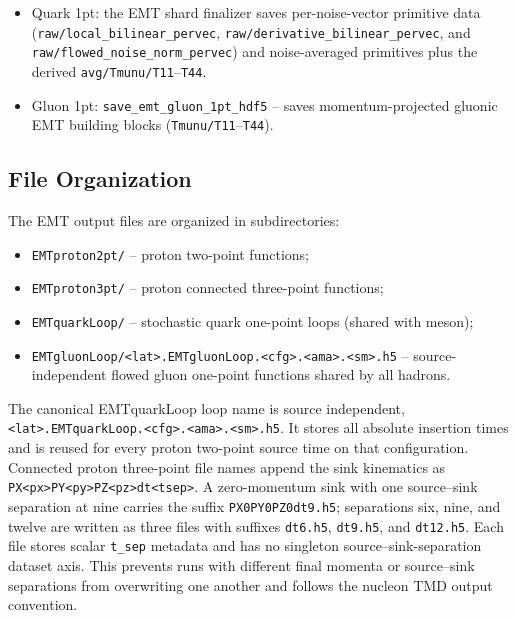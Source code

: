 \documentclass[11pt,a4paper]{article}
\begin{document}
\begin{itemize}
  \item Quark 1pt: the EMT shard finalizer saves per-noise-vector primitive data
        (\texttt{raw/local\_bilinear\_pervec},
        \texttt{raw/derivative\_bilinear\_pervec}, and
        \texttt{raw/flowed\_noise\_norm\_pervec}) and noise-averaged primitives plus the
        derived \texttt{avg/Tmunu/T11}--\texttt{T44}.

  \item Gluon 1pt: \texttt{save\_emt\_gluon\_1pt\_hdf5} --
        saves momentum-projected gluonic EMT building blocks
        (\texttt{Tmunu/T11}--\texttt{T44}).
\end{itemize}

\subsection{File Organization}

The EMT output files are organized in subdirectories:
\begin{itemize}
  \item \texttt{EMTproton2pt/} -- proton two-point functions;
  \item \texttt{EMTproton3pt/} -- proton connected three-point functions;
  \item \texttt{EMTquarkLoop/} -- stochastic quark one-point loops (shared with meson);
  \item \texttt{EMTgluonLoop/<lat>.EMTgluonLoop.<cfg>.<ama>.<sm>.h5} -- source-independent
        flowed gluon one-point functions shared by all hadrons.
\end{itemize}
The canonical EMTquarkLoop loop name is source independent,
\texttt{<lat>.EMTquarkLoop.<cfg>.<ama>.<sm>.h5}.  It stores all absolute insertion
times and is reused for every proton two-point source time on that
configuration.
Connected proton three-point file names append the sink kinematics as
\texttt{PX<px>PY<py>PZ<pz>dt<tsep>}.  A zero-momentum sink with one
source--sink separation at nine carries the suffix
\texttt{PX0PY0PZ0dt9.h5}; separations six, nine, and twelve are written as
three files with suffixes \texttt{dt6.h5}, \texttt{dt9.h5}, and
\texttt{dt12.h5}.  Each file stores scalar \texttt{t\_sep} metadata and has
no singleton source--sink-separation dataset axis.  This prevents runs with different
final momenta or source--sink separations from overwriting one another and
follows the nucleon TMD output convention.

\end{document}
